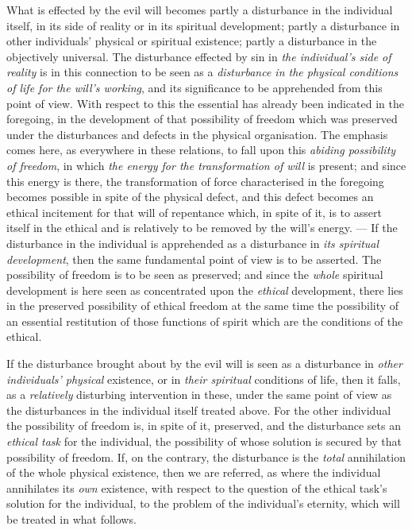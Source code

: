 \documentclass[12pt,a4paper]{book}
\begin{document}
What is effected by the evil will becomes partly a disturbance in the
individual itself, in its side of reality or in its spiritual development;
partly a disturbance in other individuals' physical or spiritual existence;
partly a disturbance in the objectively universal. The disturbance effected by
sin in \emph{the individual's side of reality} is in this connection to be seen
as a \emph{disturbance in the physical conditions of life for the will's
working}, and its significance to be apprehended from this point of view. With
respect to this the essential has already been indicated in the foregoing, in
the development of that possibility of freedom which was preserved under the
disturbances and defects in the physical organisation. The emphasis comes here,
as everywhere in these relations, to fall upon this \emph{abiding possibility
of freedom}, in which \emph{the energy for the transformation of will} is
present; and since this energy is there, the transformation of force
characterised in the foregoing becomes possible in spite of the physical
defect, and this defect becomes an ethical incitement for that will of
repentance which, in spite of it, is to assert itself in the ethical and is
relatively to be removed by the will's energy. --- If the disturbance in the
individual is apprehended as a disturbance in \emph{its spiritual development},
then the same fundamental point of view is to be asserted. The possibility of
freedom is to be seen as preserved; and since the \emph{whole} spiritual
development is here seen as concentrated upon the \emph{ethical} development,
there lies in the preserved possibility of ethical freedom at the same time the
possibility of an essential restitution of those functions of spirit which are
the conditions of the ethical.

If the disturbance brought about by the evil will is seen as a disturbance in
\emph{other individuals' physical} existence, or in \emph{their spiritual}
conditions of life, then it falls, as a \emph{relatively} disturbing
intervention in these, under the same point of view as the disturbances in the
individual itself treated above. For the other individual the possibility of
freedom is, in spite of it, preserved, and the disturbance sets an \emph{ethical
task} for the individual, the possibility of whose solution is secured by that
possibility of freedom. If, on the contrary, the disturbance is the
\emph{total} annihilation of the whole physical existence, then we are
referred, as where the individual annihilates its \emph{own} existence, with
respect to the question of the ethical task's solution for the individual, to
the problem of the individual's eternity, which will be treated in what follows.
\end{document}
